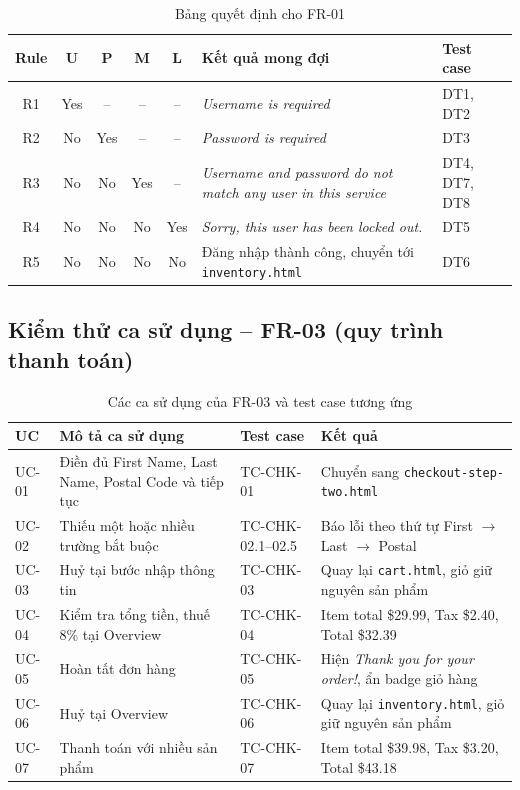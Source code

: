 \documentclass[12pt,a4paper]{article}
\newcommand{\tablestyle}{\small\renewcommand{\arraystretch}{1.25}}
\newcommand{\hrow}{\rowcolor{tablehead}}
\begin{document}
\begin{table}[H]
\centering
\tablestyle
\caption{Bảng quyết định cho FR-01}
\label{tab:dt-login}
\begin{tabularx}{\textwidth}{c c c c c Y L{2.9cm}}
\toprule
\hrow \textbf{Rule} & \textbf{U} & \textbf{P} & \textbf{M} & \textbf{L} & \textbf{Kết quả mong đợi} & \textbf{Test case} \\
\midrule
R1 & Yes & -- & -- & -- & \textit{Username is required} & DT1, DT2 \\
R2 & No & Yes & -- & -- & \textit{Password is required} & DT3 \\
R3 & No & No & Yes & -- & \textit{Username and password do not match any user in this service} & DT4, DT7, DT8 \\
R4 & No & No & No & Yes & \textit{Sorry, this user has been locked out.} & DT5 \\
R5 & No & No & No & No & Đăng nhập thành công, chuyển tới \texttt{inventory.html} & DT6 \\
\bottomrule
\end{tabularx}
\end{table}

\subsection{Kiểm thử ca sử dụng -- FR-03 (quy trình thanh toán)}
\begin{table}[H]
\centering
\tablestyle
\caption{Các ca sử dụng của FR-03 và test case tương ứng}
\label{tab:uc-checkout}
\begin{tabularx}{\textwidth}{L{1.4cm}YL{3.3cm}Y}
\toprule
\hrow \textbf{UC} & \textbf{Mô tả ca sử dụng} & \textbf{Test case} & \textbf{Kết quả} \\
\midrule
UC-01 & Điền đủ First Name, Last Name, Postal Code và tiếp tục & TC-CHK-01 & Chuyển sang \texttt{checkout-step-two.html} \\
UC-02 & Thiếu một hoặc nhiều trường bắt buộc & TC-CHK-02.1--02.5 & Báo lỗi theo thứ tự First $\rightarrow$ Last $\rightarrow$ Postal \\
UC-03 & Huỷ tại bước nhập thông tin & TC-CHK-03 & Quay lại \texttt{cart.html}, giỏ giữ nguyên sản phẩm \\
UC-04 & Kiểm tra tổng tiền, thuế 8\% tại Overview & TC-CHK-04 & Item total \$29.99, Tax \$2.40, Total \$32.39 \\
UC-05 & Hoàn tất đơn hàng & TC-CHK-05 & Hiện \textit{Thank you for your order!}, ẩn badge giỏ hàng \\
UC-06 & Huỷ tại Overview & TC-CHK-06 & Quay lại \texttt{inventory.html}, giỏ giữ nguyên sản phẩm \\
UC-07 & Thanh toán với nhiều sản phẩm & TC-CHK-07 & Item total \$39.98, Tax \$3.20, Total \$43.18 \\
\bottomrule
\end{tabularx}
\end{table}
\end{document}
